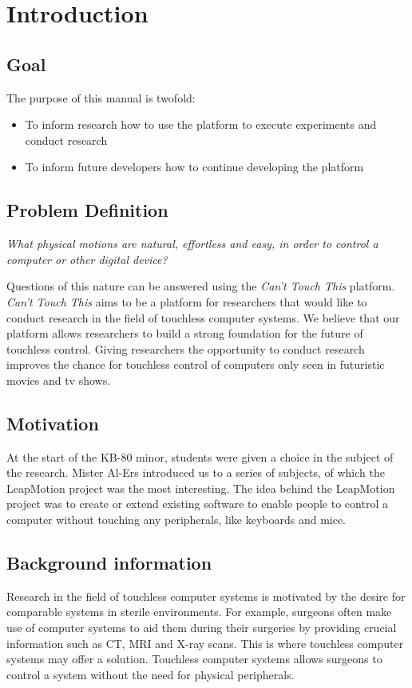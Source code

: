 \documentclass{standalone}
\begin{document}
  \section{Introduction}
  \subsection{Goal}
  The purpose of this manual is twofold:
  \begin{itemize}
    \tightlist{}
    \item To inform research how to use the platform to execute experiments and
      conduct research
    \item To inform future developers how to continue developing the platform
  \end{itemize}

  \subsection{Problem Definition}
  \textit{What physical motions are natural, effortless and easy, in order to
    control a computer or other digital device?}

  Questions of this nature can be answered using the \textit{Can't Touch This}
  platform. \textit{Can't Touch This} aims to be a platform for researchers that
  would like to conduct research in the field of touchless computer systems. We
  believe that our platform allows researchers to build a strong foundation for
  the future of touchless control. Giving researchers the opportunity to conduct
  research improves the chance for touchless control of computers only seen in
  futuristic movies and tv shows.

  \subsection{Motivation}
  At the start of the KB-80 minor, students were given a choice in the subject
  of the research. Mister Al-Ers introduced us to a series of subjects, of which
  the LeapMotion project was the most interesting. The idea behind the
  LeapMotion project was to create or extend existing software to enable people
  to control a computer without touching any peripherals, like keyboards and
  mice.

  \subsection{Background information}
  Research in the field of touchless computer systems is motivated by the desire
  for comparable systems in sterile environments. For example, surgeons often
  make use of computer systems to aid them during their surgeries by providing
  crucial information such as CT, MRI and X-ray scans. This is where touchless
  computer systems may offer a solution. Touchless computer systems allows
  surgeons to control a system without the need for physical peripherals.
  \clearpage
\end{document}
